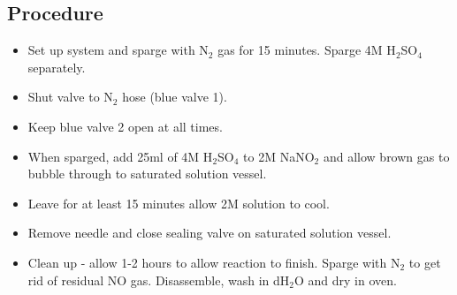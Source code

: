 \subsection*{Procedure}
\begin{itemize}
 \item Set up system and sparge with N$_{\textrm{2}}$ gas for 15 minutes. Sparge 4M H$_{\textrm{2}}$SO$_{\textrm{4}}$ separately.
 \item Shut valve to N$_{\textrm{2}}$ hose (blue valve 1).
 \item Keep blue valve 2 open at all times.
 \item When sparged, add 25ml of 4M H$_{\textrm{2}}$SO$_{\textrm{4}}$ to 2M NaNO$_{\textrm{2}}$ and allow brown gas to bubble through to saturated solution vessel.
 \item Leave for at least 15 minutes allow 2M solution to cool.
 \item Remove needle and close sealing valve on saturated solution vessel.
 \item Clean up - allow 1-2 hours to allow reaction to finish. Sparge with N$_{\textrm{2}}$ to get rid of residual NO gas. Disassemble, wash in dH$_{\textrm{2}}$O and dry in oven.
\end{itemize}
